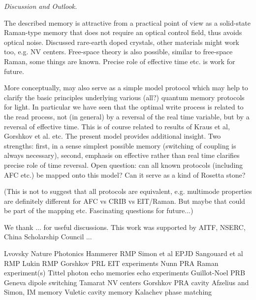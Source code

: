\documentclass[aps,prl,twocolumn]{revtex4}
\begin{document}
{\it Discussion and Outlook.}

The described memory is attractive from a practical point of view as a solid-state Raman-type memory that does not require an optical control field, thus avoids optical noise. Discussed rare-earth doped crystals, other materials might work too, e.g. NV centers. Free-space theory is also possible, similar to free-space Raman, some things are known. Precise role of effective time etc. is work for future.

More conceptually, may also serve as a simple model protocol which may help to clarify the basic principles underlying various (all?) quantum memory protocols for light. In particular we have seen that the optimal write process is related to the read process, not (in general) by a reversal of the real time variable, but by a reversal of effective time. This is of course related to results of Kraus et al, Gorshkov et al. etc. The present model provides additional insight. Two strengths: first, in a sense simplest possible memory (switching of coupling is always necessary), second, emphasis on effective rather than real time clarifies precise role of time reversal. Open question: can all known protocols (including AFC etc.) be mapped onto this model? Can it serve as a kind of Rosetta stone?

(This is not to suggest that all protocols are equivalent, e.g. multimode properties are definitely different for AFC vs CRIB vs EIT/Raman. But maybe that could be part of the mapping etc. Fascinating questions for future...)




We thank ... for useful discussions. This work was supported by AITF, NSERC, China Scholarship Council ...

\begin{thebibliography}{99}
 Lvovsky Nature Photonics
 Hammerer RMP
 Simon et al EPJD
 Sangouard et al RMP
 Lukin RMP
 Gorshkov PRL
 EIT experiments
 Nunn PRA
 Raman experiment(s)
 Tittel photon echo memories
 echo experiments
 Guillot-Noel PRB
 Geneva dipole switching
 Tamarat NV centers
 Gorshkov PRA cavity
 Afzelius and Simon, IM memory
 Vuletic cavity memory
 Kalachev phase matching


\end{thebibliography}
\end{document}

